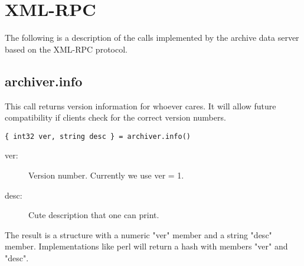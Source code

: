 \section{XML-RPC}
The following is a description of the calls implemented by the archive
data server based on the XML-RPC protocol.

\subsection{archiver.info}
This call returns version information for 
whoever cares. It will allow future compatibility
if clients check for the correct version numbers.

\begin{lstlisting}[keywordstyle=\sffamily]
{ int32 ver, string desc } = archiver.info()
\end{lstlisting}

\begin{description}
\item[ver:]  Version number. Currently we use ver = 1.
\item[desc:] Cute description that one can print.
\end{description}

The result is a structure with a numeric "ver"
member and a string "desc" member. Implementations
like perl will return a hash with members "ver"
and "desc".

